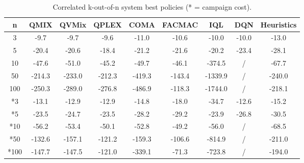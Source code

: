 \begin{table}
\centering
\setlength\tabcolsep{4.5pt}
\begin{tabular}{c|ccccccc|c}
\toprule
n & QMIX & QVMix & QPLEX & COMA & FACMAC & IQL & DQN & Heuristics \\
\midrule
3 & -9.7 & -9.7 & -9.6 & -11.0 & -10.6 & -10.0 & -10.0 & -13.0 \\
5 & -20.4 & -20.6 & -18.4 & -21.2 & -21.6 & -20.2 & -23.4 & -28.1 \\
10 & -47.6 & -51.0 & -45.2 & -49.7 & -46.1 & -374.5 & / & -67.7 \\
50 & -214.3 & -233.0 & -212.3 & -419.3 & -143.4 & -1339.9 & / & -240.0 \\
100 & -250.3 & -289.0 & -276.8 & -486.9 & -118.3 & -1744.0 & / & -218.1 \\
\midrule
*3 & -13.1 & -12.9 & -12.9 & -14.8 & -18.0 & -34.7 & -12.6 & -15.2 \\
*5 & -23.5 & -24.7 & -23.5 & -28.2 & -29.2 & -23.9 & -26.8 & -30.5 \\
*10 & -56.2 & -53.4 & -50.1 & -52.8 & -49.2 & -56.0 & / & -68.5 \\
*50 & -132.6 & -157.1 & -121.2 & -159.3 & -106.6 & -814.9 & / & -211.0 \\
*100 & -147.7 & -147.5 & -121.0 & -339.1 & -71.3 & -723.8 & / & -194.0 \\
\bottomrule
\end{tabular}
\caption{Correlated k-out-of-n system best policies (* = campaign cost).}
\label{tab:correlatedkoutofnresults}
\end{table}



